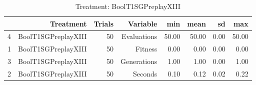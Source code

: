 \begin{table}[ht]
\centering
\begin{tabular}{rrrrrrrr}
  \hline
 & Treatment & Trials & Variable & min & mean & sd & max \\ 
  \hline
4 & BoolT1SGPreplayXIII &  50 & Evaluations & 50.00 & 50.00 & 0.00 & 50.00 \\ 
  1 & BoolT1SGPreplayXIII &  50 & Fitness & 0.00 & 0.00 & 0.00 & 0.00 \\ 
  3 & BoolT1SGPreplayXIII &  50 & Generations & 1.00 & 1.00 & 0.00 & 1.00 \\ 
  2 & BoolT1SGPreplayXIII &  50 & Seconds & 0.10 & 0.12 & 0.02 & 0.22 \\ 
   \hline
\end{tabular}
\caption{Treatment: BoolT1SGPreplayXIII} 
\end{table}
